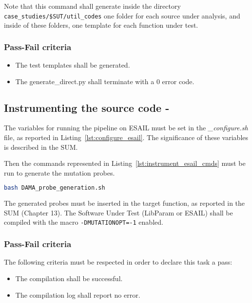 Note that this command shall generate inside the directory \texttt{case\_studies/\$SUT/util\_codes} one folder for each source under analysis, and inside of these folders, one template for each function under test.

\subsubsection{Pass-Fail criteria}

\begin{itemize}
  \item The test templates shall be generated.
  \item The generate\_direct.py shall terminate with a 0 error code.
\end{itemize}

\subsection{Instrumenting the source code - \DAMA}
\label{subsec:instrumenting}

The variables for running the \DAMA pipeline on ESAIL must be set in the \emph{\DAMA\_configure.sh} file, as reported in Listing~\ref{lst:configure_esail}. The significance of these variables is described in the SUM.

Then the commands represented in Listing~\ref{lst:instrument_esail_cmds} must be run to generate the mutation probes.

\begin{lstlisting}[language=bash, label={lst:instrument_esail_cmds}]
bash DAMA_probe_generation.sh
\end{lstlisting}

The generated probes must be inserted in the target function, as reported in the SUM (Chapter 13).
The Software Under Test (LibParam or ESAIL) shall be compiled with the macro \texttt{-DMUTATIONOPT=-1} enabled.

\subsubsection{Pass-Fail criteria}

The following criteria must be respected in order to declare this task a pass:
\begin{itemize}
  \item The compilation shall be successful.
  \item The compilation log shall report no error.
\end{itemize}

